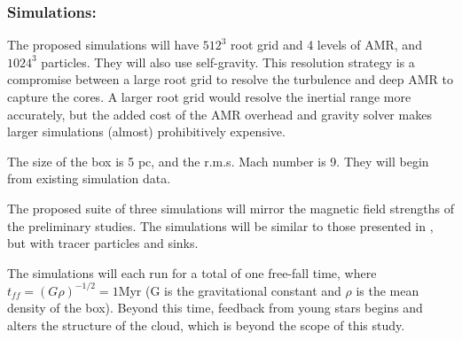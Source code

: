 \subsubsection{Simulations: \nameCores}
\label{subsec.cores_sims}


The proposed simulations will have $512^3$ root grid and 4 levels of
AMR, and $1024^3$ particles.  They will also use self-gravity.  This resolution strategy is a compromise between
a large root grid to resolve the turbulence and deep AMR to capture the cores.
A larger root grid would resolve the inertial range more accurately, but the
added cost of the AMR overhead and gravity solver makes larger simulations
(almost) prohibitively expensive.  

The size of the box is 5 pc, and the r.m.s. Mach number is 9.  They
will begin from existing simulation data.  

The proposed suite of three simulations will mirror the magnetic field strengths
of the preliminary studies.  The simulations will be similar to those presented
in \citep{Collins12}, but with tracer particles and sinks.

The simulations  will each run for a total of one free-fall time, where $t_{ff}=(G
\rho)^{-1/2}=1$Myr (G is the gravitational constant and $\rho$ is the mean
density of the box).  Beyond this time, feedback from young stars begins and
alters the structure of the cloud, which is beyond the scope of this study. 

